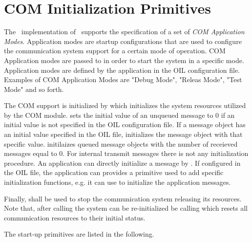 \pagebreak


\section{COM Initialization Primitives}
The \oc\ implementation of \ee\ supports the specification of a set of {\it COM 
Application Modes}. Application modes are startup configurations that are used to
configure the communication system support for a certain mode of operation. 
COM Application modes are passed to  in order to start
the system in a specific mode. Application modes are defined by the application in 
the OIL configuration file. Examples of COM Application Modes are "Debug Mode", 
"Releas Mode", "Test Mode" and so forth. 

The COM support is initialized by  which initializes the system 
resources utilized by the COM module.  sets the initial value of 
an unqueued message to 0 if an initial value is not specified in the OIL
configuration file. If a message object has an initial value specified in the OIL
file,  initializes the message object with that specific value.
 initilaizes queued message objects with the number of receieved 
messages equal to 0. For internal transmit messages there is not any initialization 
procedure. An application can directly initialize a message by . If 
configured in the OIL file, the application can provides a  
primitive used to add specific initialization functions, e.g. it can use 
 to initialize the application messages.

Finally,  shall be used to stop the communication system releasing 
its resources. Note that, after calling  the system can be re-initialized 
be calling  which resets all communication resources to their 
initial status. 

The start-up primitives are listed in the following.

\pagebreak

